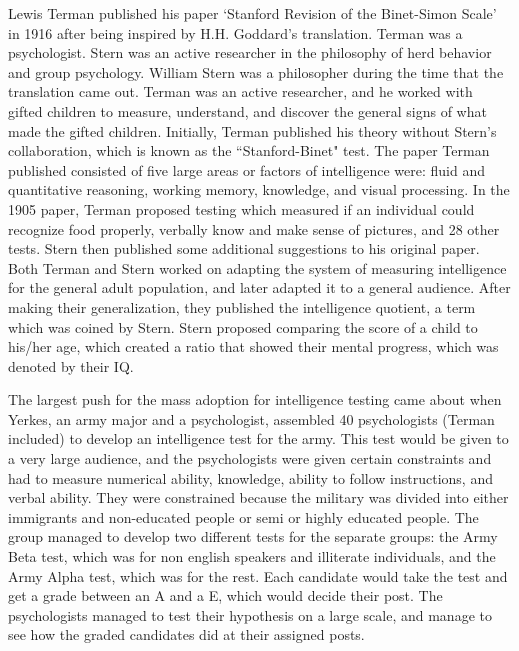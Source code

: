 \documentclass[12pt, oneside]{article}
\begin{document}
\par Lewis Terman published his paper `Stanford Revision of the Binet-Simon Scale' in 1916 after being inspired by H.H. Goddard's translation. Terman was a psychologist. Stern was an active researcher in the philosophy of herd behavior and group psychology. William Stern was a philosopher during the time that the translation came out. Terman was an active researcher, and he worked with gifted children to measure, understand, and discover the general signs of what made the gifted children. Initially, Terman published his theory without Stern's collaboration, which is known as the ``Stanford-Binet" test. The paper Terman published consisted of five large areas or factors of intelligence were: fluid and quantitative reasoning, working memory, knowledge, and visual processing. In the 1905 paper, Terman proposed testing which measured if an individual could recognize food properly, verbally know and make sense of pictures, and 28 other tests. Stern then published some additional suggestions to his original paper. Both Terman and Stern worked on adapting the system of measuring intelligence for the general adult population, and later adapted it to a general audience. After making their generalization, they published the intelligence quotient, a term which was coined by Stern. Stern proposed comparing the score of a child to his/her age, which created a ratio that showed their mental progress, which was denoted by their IQ.

\par The largest push for the mass adoption for intelligence testing came about when Yerkes, an army major and a psychologist, assembled 40 psychologists (Terman included) to develop an intelligence test for the army. This test would be given to a very large audience, and the psychologists were given certain constraints and had to measure numerical ability, knowledge, ability to follow instructions, and verbal ability. They were constrained because the military was divided into either immigrants and non-educated people or semi or highly educated people. The group managed to develop two different tests for the separate groups: the Army Beta test, which was for non english speakers and illiterate individuals, and the Army Alpha test, which was for the rest. Each candidate would take the test and get a grade between an A and a E, which would decide their post. The psychologists managed to test their hypothesis on a large scale, and manage to see how the graded candidates did at their assigned posts.
\end{document}
